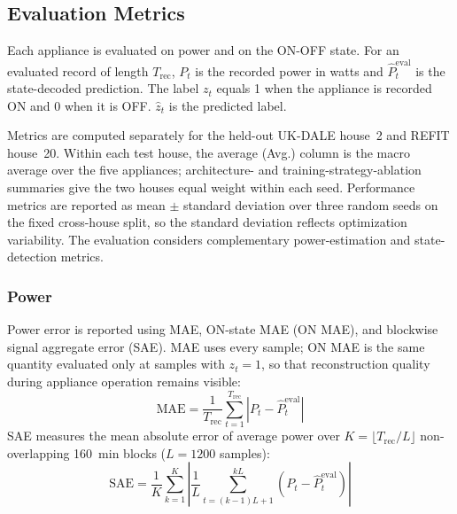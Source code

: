 \documentclass[journal]{IEEEtran}
\begin{document}
\subsection{Evaluation Metrics}
\label{sec:metrics}

Each appliance is evaluated on power and on the ON-OFF state. For an evaluated record of length $T_{\mathrm{rec}}$, $P_t$ is the recorded power in watts and $\hat P_t^{\mathrm{eval}}$ is the state-decoded prediction. The label $z_t$ equals 1 when the appliance is recorded ON and 0 when it is OFF. $\hat z_t$ is the predicted label.

Metrics are computed separately for the held-out UK-DALE house~2 and REFIT house~20. Within each test house, the average (Avg.) column is the macro average over the five appliances; architecture- and training-strategy-ablation summaries give the two houses equal weight within each seed. Performance metrics are reported as mean $\pm$ standard deviation over three random seeds on the fixed cross-house split, so the standard deviation reflects optimization variability. The evaluation considers complementary power-estimation and state-detection metrics.

\subsubsection{Power}
Power error is reported using MAE, ON-state MAE (ON MAE), and blockwise signal aggregate error (SAE). MAE uses every sample; ON MAE is the same quantity evaluated only at samples with $z_t=1$, so that reconstruction quality during appliance operation remains visible:
\begin{equation}
\mathrm{MAE}=\frac{1}{T_{\mathrm{rec}}}\sum_{t=1}^{T_{\mathrm{rec}}}\left|P_t-\hat P_t^{\mathrm{eval}}\right|
\label{eq:mae}
\end{equation}
SAE measures the mean absolute error of average power over $K=\lfloor T_{\mathrm{rec}}/L\rfloor$ non-overlapping 160~min blocks ($L=1200$ samples):
\begin{equation}
\mathrm{SAE}=\frac{1}{K}\sum_{k=1}^{K}\left|\frac{1}{L}\sum_{t=(k-1)L+1}^{kL}\left(P_t-\hat P_t^{\mathrm{eval}}\right)\right|
\label{eq:sae}
\end{equation}
\end{document}
